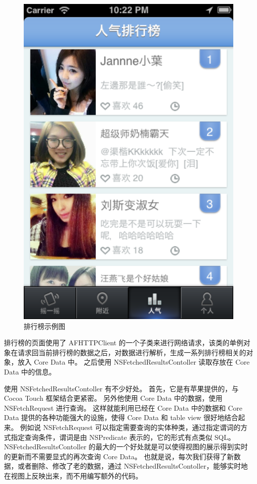 \begin{figure}[h!]
    \centering
    \includegraphics[width=320pt]{figure/ranking_list.png}
    \caption{排行榜示例图}
    \label{ranking-list}
\end{figure}

排行榜的页面使用了 AFHTTPClient 的一个子类来进行网络请求，该类的单例对象在请求回当前排行榜的数据之后，对数据进行解析，生成一系列排行榜相关的对象，放入 Core Data 中。
之后使用 NSFetchedResultsContoller 读取存放在 Core Data 中的信息。

使用 NSFetchedResultsContoller 有不少好处。
首先，它是有苹果提供的，与 Cocoa Touch 框架结合更紧密。
另外他使用 Core Data 中的数据，使用 NSFetchRequest 进行查询。
这样就能利用已经在 Core Data 中的数据和 Core Data 提供的各种功能强大的设施，使得 Core Data 和 table view 很好地结合起来。
例如说 NSFetchRequest 可以指定需要查询的实体种类，通过指定谓词的方式指定查询条件，谓词是由 NSPredicate 表示的，它的形式有点类似 SQL。
NSFetchedResultsContoller 的最大的一个好处就是可以使得视图的展示得到实时的更新而不需要显式的再次查询 Core Data。
也就是说，每次我们获得了新数据，或者删除、修改了老的数据，通过 NSFetchedResultsContoller，能够实时地在视图上反映出来，而不用编写额外的代码。


